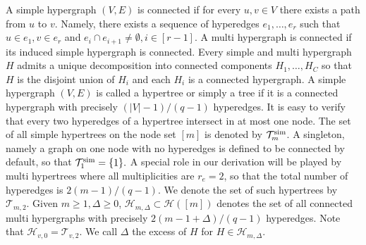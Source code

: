 \documentclass[12pt]{article}
\newcommand{\cH}{\mathcal{H}}
\newcommand{\cT}{\mathcal{T}}
\begin{document}
A simple hypergraph $(V,E)$ is connected if for every $u,v\in V$ there exists a path from $u$ to $v$. Namely, there exists a sequence of hyperedges $e_1,\ldots,e_r$
such that $u\in e_1,v\in e_r$ and $e_i\cap e_{i+1}\ne\emptyset, i\in [r-1]$. A multi hypergraph is connected if its induced simple hypergraph is connected. 
Every simple and multi hypergraph $H$ admits a unique decomposition into 
connected components $H_1,\ldots,H_C$ so that $H$ is the disjoint union of $H_i$ and each $H_i$
is a connected hypergraph.
A simple hypergraph $(V,E)$ is  called a hypertree or simply a tree 
if it is a connected hypergraph with precisely $(|V|-1)/(q-1)$ hyperedges. 
It is easy to verify that every two hyperedges of a hypertree intersect in at most one node.
The set of all simple hypertrees 
on the node set $[m]$ is denoted by $\cT^{\rm sim}_m$. A singleton, namely a graph on one node with no hyperedges is defined to be connected by default, so that $\cT_{1}^{\rm sim}=\{1\}.$
A special role in our derivation 
will be played by multi hypertrees where all multiplicities are $r_e=2$, so that the total number of hyperedges is $2(m-1)/(q-1)$. We denote the set of
such hypertrees by $\cT_{m,2}$. Given $m\ge 1,\Delta\ge 0$, $\cH_{m,\Delta}\subset \cH([m])$ denotes the set of all connected multi hypergraphs  with 
precisely $2(m-1+\Delta)/(q-1)$ hyperedges. Note that $\cH_{v,0}=\cT_{v,2}$. We call $\Delta$ the excess of $H$ for $H\in\cH_{m,\Delta}$. 
\end{document}
